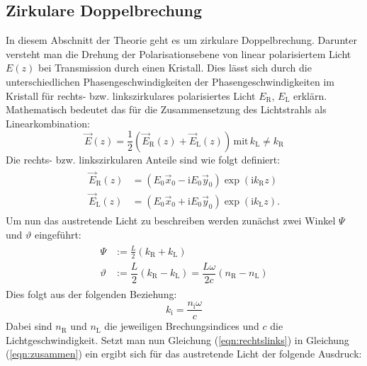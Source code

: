 \subsection{Zirkulare Doppelbrechung}
\label{sec:zirkulare_doppelbrechung}
In diesem Abschnitt der Theorie geht es um zirkulare Doppelbrechung. Darunter versteht man die Drehung der Polarisationsebene von linear polarisiertem Licht $E(z)$ bei Transmission durch einen Kristall.
Dies lässt sich durch die unterschiedlichen Phasengeschwindigkeiten der Phasengeschwindigkeiten im Kristall für rechts- bzw. linkszirkulares polarisiertes Licht $E_\mathrm{R}$, $E_\mathrm{L}$ erklärn. Mathematisch bedeutet das für
die Zusammensetzung des Lichtstrahls als Linearkombination:
\begin{equation}
  \label{eqn:zusammen}
  \vec{E}(z)=\dfrac{1}{2}(\vec{E}_\mathrm{R}(z)+\vec{E}_\mathrm{L}(z)) \, \mathrm{mit} \, k_\mathrm{L}\neq k_\mathrm{R}
\end{equation}
Die rechts- bzw. linkszirkularen Anteile sind wie folgt definiert:
\begin{align}
  \label{eqn:rechtslinks}
  \begin{aligned}
  \vec{E}_\mathrm{R}(z) &= \left(E_\mathrm{0} \vec{x}_\mathrm{0} - \mathrm{i}E_\mathrm{0}\vec{y}_\mathrm{0}\right)\exp\left(\mathrm{i}{k}_\mathrm{R}z\right)\\
  \vec{E}_\mathrm{L}(z) &= \left(E_\mathrm{0} \vec{x}_\mathrm{0} + \mathrm{i}E_\mathrm{0}\vec{y}_\mathrm{0}\right)\exp\left(\mathrm{i}{k}_\mathrm{L}z\right).
\end{aligned}
\end{align}
Um nun das austretende Licht zu beschreiben werden zunächst zwei Winkel $\Psi$ und $\vartheta$ eingeführt:
\begin{align}
  \label{eqn:winkel}
  \begin{aligned}
    \Psi&:=\frac{L}{2}(k_\mathrm{R}+k_\mathrm{L}) \\
    \vartheta &:= \dfrac{L}{2}(k_\mathrm{R}-k_\mathrm{L}) = \dfrac{L\omega}{2c}\left(n_\mathrm{R}-n_\mathrm{L}\right)
\end{aligned}
\end{align}
Dies folgt aus der folgenden Beziehung:
\begin{equation*}
   k_\mathrm{i}=\frac{n_\mathrm{i}\omega}{c}
\end{equation*}
Dabei sind $n_\mathrm{R}$ und $n_\mathrm{L}$ die jeweiligen Brechungsindices und $c$ die Lichtgeschwindigkeit.
Setzt man nun Gleichung (\ref{eqn:rechtslinks}) in Gleichung (\ref{eqn:zusammen}) ein ergibt sich für das austretende Licht der folgende Ausdruck:
